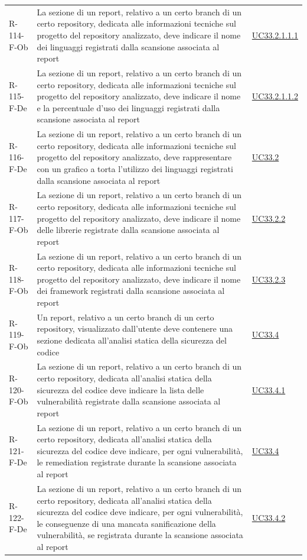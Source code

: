 \documentclass[a4paper, 11pt]{article}
\begin{document}
\begin{longtable}[c]{ >{\centering\arraybackslash}m{2.5cm} >{\centering\arraybackslash}m{8.3cm} >{\centering\arraybackslash}m{3.5cm} }
    R-114-F-Ob & La sezione di un report, relativo a un certo branch di un certo repository, dedicata alle informazioni tecniche sul progetto del repository analizzato, deve indicare il nome dei linguaggi registrati dalla scansione associata al report & \hyperref[UC33.2.1.1.1]{UC33.2.1.1.1}\\
    R-115-F-De & La sezione di un report, relativo a un certo branch di un certo repository, dedicata alle informazioni tecniche sul progetto del repository analizzato, deve indicare il nome e la percentuale d'uso dei linguaggi registrati dalla scansione associata al report & \hyperref[UC33.2.1.1.2]{UC33.2.1.1.2}\\
    R-116-F-De & La sezione di un report, relativo a un certo branch di un certo repository, dedicata alle informazioni tecniche sul progetto del repository analizzato, deve rappresentare con un grafico a torta l'utilizzo dei linguaggi registrati dalla scansione associata al report & \hyperref[UC33.2]{UC33.2}\\
    R-117-F-Ob & La sezione di un report, relativo a un certo branch di un certo repository, dedicata alle informazioni tecniche sul progetto del repository analizzato, deve indicare il nome delle librerie registrate dalla scansione associata al report & \hyperref[UC33.2.2]{UC33.2.2}\\
    R-118-F-Ob & La sezione di un report, relativo a un certo branch di un certo repository, dedicata alle informazioni tecniche sul progetto del repository analizzato, deve indicare il nome dei framework registrati dalla scansione associata al report & \hyperref[UC33.2.3]{UC33.2.3}\\
    R-119-F-Ob & Un report, relativo a un certo branch di un certo repository, visualizzato dall'utente deve contenere una sezione dedicata all'analisi statica della sicurezza del codice & \hyperref[UC33.4]{UC33.4}\\
    R-120-F-Ob & La sezione di un report, relativo a un certo branch di un certo repository, dedicata all'analisi statica della sicurezza del codice deve indicare la lista delle vulnerabilità registrate dalla scansione associata al report & \hyperref[UC33.4.1]{UC33.4.1}\\
    R-121-F-De & La sezione di un report, relativo a un certo branch di un certo repository, dedicata all'analisi statica della sicurezza del codice deve indicare, per ogni vulnerabilità, le remediation registrate durante la scansione associata al report & \hyperref[UC33.4]{UC33.4}\\
    R-122-F-De & La sezione di un report, relativo a un certo branch di un certo repository, dedicata all'analisi statica della sicurezza del codice deve indicare, per ogni vulnerabilità, le conseguenze di una mancata sanificazione della vulnerabilità, se registrata durante la scansione associata al report & \hyperref[UC33.4.2]{UC33.4.2}\\

\end{longtable}
\end{document}
